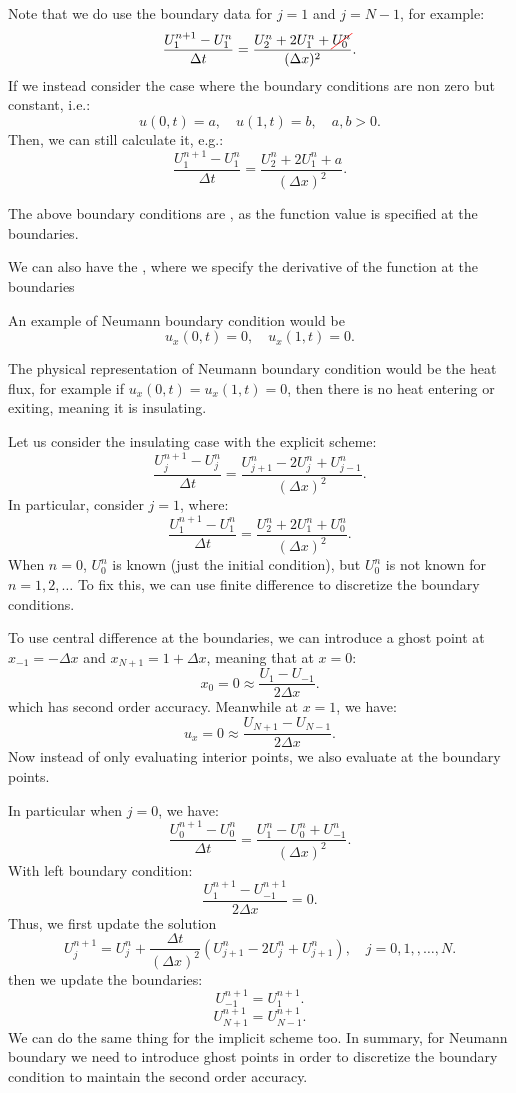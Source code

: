 \documentclass[../main/main.tex]{subfiles}
\begin{document}
Note that we do use the boundary data for $j=1$ and $j=N-1$, for example:  \[
    \frac{U_1^{n+1}-U^n_1}{\Delta t} = \frac{U_2^n + 2U^n_1 + \Ccancel[red]{U^n_0}}{(\Delta x)^2}
.\] 
If we instead consider the case where the boundary conditions are non zero but constant, i.e.: \[
    u(0,t) = a, \quad u(1,t) = b, \quad a,b>0
.\] Then, we can still calculate it, e.g.: \[ 
\frac{U_1^{n+1}-U^n_1}{\Delta t} = \frac{U_2^n + 2U^n_1 + a}{(\Delta x)^2}
.\] 
\begin{definition} 
    The above boundary conditions are , as the function value is specified at the boundaries.
\end{definition}
\begin{definition}
    We can also have the , where we specify the derivative of the function at the boundaries
\end{definition}
\begin{example} 
    An example of Neumann boundary condition would be \[
        u_x(0,t) = 0, \quad u_x(1,t) = 0
    .\] 
    
\end{example}
\begin{remark}
    The physical representation of Neumann boundary condition would be the heat flux, for example if $u_x(0,t) = u_x(1,t) = 0$, then there is no heat entering or exiting, meaning it is insulating.
\end{remark}
Let us consider the insulating case with the explicit scheme: \[
    \frac{U_j^{n+1}-U_j^n}{\Delta t} = \frac{U_{j+1}^n - 2U^n_j + U_{j-1}^n}{(\Delta x)^2}
.\] In particular, consider $j=1$, where: \[
\frac{U_1^{n+1}-U^n_1}{\Delta t} = \frac{U_2^n + 2U^n_1 + U^n_0}{(\Delta x)^2}
.\] 
When $n=0$, $U_0^n$ is known (just the initial condition), but $U_0^n$ is not known for $n = 1,2,\ldots$ To fix this, we can use finite difference to discretize the boundary conditions.


To use central difference at the boundaries, we can introduce a ghost point at $x_{-1} = -\Delta x$ and $x_{N+1} = 1+\Delta x$, meaning that at $x=0$: \[
x_0 = 0 \approx \frac{U_1 - U_{-1}}{2\Delta x}
.\] which has second order accuracy. Meanwhile at $x=1$, we have: \[
u_x = 0 \approx \frac{U_{N+1}-U_{N-1}}{2\Delta x}
.\] 
Now instead of only evaluating interior points, we also evaluate at the boundary points.

In particular when $j=0$, we have: \[
    \frac{U^{n+1}_0 - U^n_0}{\Delta t} = \frac{U_1^{n}-U_0^{n}+U_{-1}^n}{(\Delta x) ^2}
.\] With left boundary condition:
\[
    \frac{U_1^{n+1}-U_{-1}^{n+1}}{2\Delta x} = 0 
.\] 
Thus, we first update the solution \[
    U_j^{n+1} = U_j^n + \frac{\Delta t}{(\Delta x)^2}\left( U_{j+1}^{n }- 2U_j^n + U_{j+1}^{n} \right) ,\quad j=0,1,,\ldots,N
.\] then we update the boundaries: \[
U_{-1}^{n+1} = U_1^{n+1}
.\]\[
U_{N+1}^{n+1} = U_{N-1}^{n+1} 
.\] 
We can do the same thing for the implicit scheme too. In summary, for Neumann boundary we need to introduce ghost points in order to discretize the boundary condition to maintain the second order accuracy.
\end{document}
